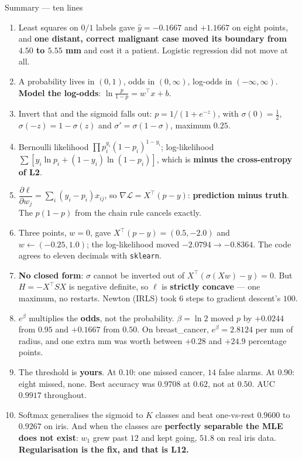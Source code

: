 \documentclass[aspectratio=169]{beamer}
\begin{document}
\begin{frame}[shrink=16]{Summary --- ten lines}
  \begin{enumerate}\small
    \item Least squares on $0/1$ labels gave $\hat y = -0.1667$ and
      $+1.1667$ on eight points, and \textbf{one distant, correct malignant
      case moved its boundary from $4.50$ to $5.55$ mm} and cost it a
      patient. Logistic regression did not move at all.
    \item A probability lives in $(0,1)$, odds in $(0,\infty)$, log-odds in
      $(-\infty,\infty)$. \textbf{Model the log-odds}:
      $\ln\frac{p}{1-p} = w^{\!\top}x + b$.
    \item Invert that and the sigmoid falls out:
      $p = 1/(1+e^{-z})$, with $\sigma(0)=\tfrac12$,
      $\sigma(-z)=1-\sigma(z)$ and $\sigma' = \sigma(1-\sigma)$, maximum
      $0.25$.
    \item Bernoulli likelihood
      $\prod p_i^{y_i}(1-p_i)^{1-y_i}$; log-likelihood
      $\sum [y_i\ln p_i + (1-y_i)\ln(1-p_i)]$, which is
      \textbf{minus the cross-entropy of L2}.
    \item $\dfrac{\partial\ell}{\partial w_j} = \sum_i (y_i - p_i)x_{ij}$,
      so $\nabla\mathcal{L} = X^{\!\top}(p-y)$: \textbf{prediction minus
      truth}. The $p(1-p)$ from the chain rule cancels exactly.
    \item Three points, $w=0$, gave $X^{\!\top}(p-y) = (0.5, -2.0)$ and
      $w \leftarrow (-0.25, 1.0)$; the log-likelihood moved
      $-2.0794 \to -0.8364$. The code agrees to eleven decimals with
      \texttt{sklearn}.
    \item \textbf{No closed form}: $\sigma$ cannot be inverted out of
      $X^{\!\top}(\sigma(Xw)-y)=0$. But $H = -X^{\!\top}SX$ is negative
      definite, so $\ell$ is \textbf{strictly concave} --- one maximum, no
      restarts. Newton (IRLS) took $6$ steps to gradient descent's $100$.
    \item $e^{\beta}$ multiplies the \textbf{odds}, not the probability.
      $\beta = \ln 2$ moved $p$ by $+0.0244$ from $0.95$ and $+0.1667$ from
      $0.50$. On breast\_cancer, $e^{\beta} = 2.8124$ per mm of radius, and
      one extra mm was worth between $+0.28$ and $+24.9$ percentage points.
    \item The threshold is \textbf{yours}. At $0.10$: one missed cancer, $14$
      false alarms. At $0.90$: eight missed, none. Best accuracy was
      $0.9708$ at $0.62$, not at $0.50$. AUC $0.9917$ throughout.
    \item Softmax generalises the sigmoid to $K$ classes and beat one-vs-rest
      $0.9600$ to $0.9267$ on iris. And when the classes are
      \textbf{perfectly separable the MLE does not exist}: $w_1$ grew past
      $12$ and kept going, $51.8$ on real iris data. \textbf{Regularisation
      is the fix, and that is L12.}
  \end{enumerate}
\end{frame}
\end{document}
